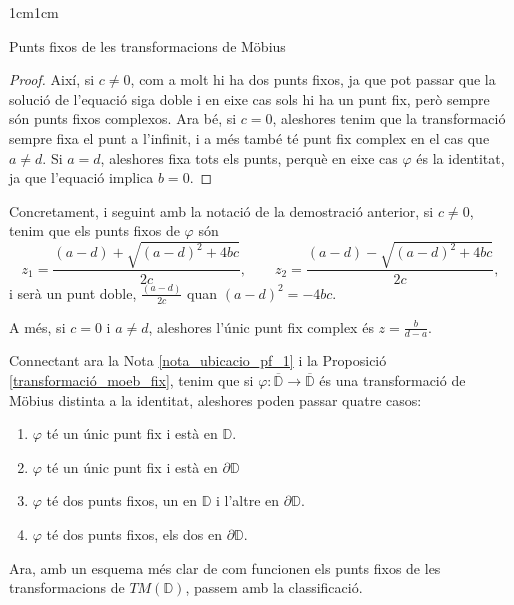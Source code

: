 \begin{adjustwidth}{1cm}{1cm}
\begin{subsection}{Punts fixos de les transformacions de Möbius}
\begin{proof}
    Així, si $c\neq 0$, com a molt hi ha dos punts fixos, ja que pot passar que la solució de l'equació siga doble i en eixe cas sols hi ha un punt fix, però sempre són punts fixos complexos. Ara bé, si $c=0$, aleshores tenim que la transformació sempre fixa el punt a l'infinit, i a més també té punt fix complex en el cas que $a\neq d$. Si $a=d$, aleshores fixa tots els punts, perquè en eixe cas $\varphi$ és la identitat, ja que l'equació implica $b=0$.
\end{proof}

\begin{nota}
    Concretament, i seguint amb la notació de la demostració anterior, si $c\neq 0$, tenim que els punts fixos de $\varphi$ són
    \[
        z_1= \frac{(a-d)+\sqrt{(a-d)^2+4bc}}{2c}, \qquad 
        z_2= \frac{(a-d)-\sqrt{(a-d)^2+4bc}}{2c},
    \]
    i serà un punt doble, $\frac{(a-d)}{2c}$ quan $(a-d)^2=-4bc$.

    A més, si $c=0$ i $a\neq d$, aleshores l'únic punt fix complex és $z=\frac{b}{d-a}$.
    \label{punts_fixos_explicits}
\end{nota}

\begin{nota}
    Connectant ara la Nota \ref{nota_ubicacio_pf_1} i la Proposició \ref{transformació_moeb_fix}, tenim que si $\varphi:\overline{\mathbb{D}}\to\overline{\mathbb{D}}$ és una transformació de Möbius distinta a la identitat, aleshores poden passar quatre casos:
    \begin{enumerate}
        \item  $\varphi$ té un únic punt fix i està en $\mathbb{D}$.
        \item $\varphi$ té un únic punt fix i està en $\partial \mathbb{D}$
        \item $\varphi$ té dos punts fixos, un en $\mathbb{D}$ i l'altre en $\partial \mathbb{D}$.
        \item $\varphi$ té dos punts fixos, els dos en $\partial \mathbb{D}$.
    \end{enumerate}
    \label{possibilitats_pf}
\end{nota}

Ara, amb un esquema més clar de com funcionen els punts fixos de les transformacions de $TM(\mathbb{D})$, passem amb la classificació.


\end{subsection}
\end{adjustwidth}
